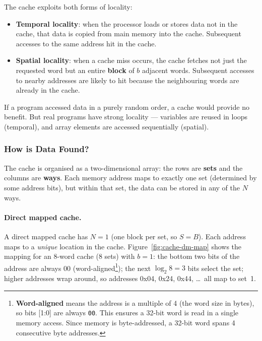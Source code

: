 \documentclass[9pt, a4paper]{extarticle}
\begin{document}
The cache exploits both forms of locality:

\begin{itemize}
    \item \textbf{Temporal locality}: when the processor loads or stores data not in the cache, that data is copied from main memory into the cache. Subsequent accesses to the same address hit in the cache.
    \item \textbf{Spatial locality}: when a cache miss occurs, the cache fetches not just the requested word but an entire \textbf{block} of $b$ adjacent words. Subsequent accesses to nearby addresses are likely to hit because the neighbouring words are already in the cache.
\end{itemize}

If a program accessed data in a purely random order, a cache would provide no benefit. But real programs have strong locality --- variables are reused in loops (temporal), and array elements are accessed sequentially (spatial).

\subsubsection{How is Data Found?}

The cache is organised as a two-dimensional array: the rows are \textbf{sets} and the columns are \textbf{ways}. Each memory address maps to exactly one set (determined by some address bits), but within that set, the data can be stored in any of the $N$ ways.


\paragraph{Direct mapped cache.} A direct mapped cache has $N = 1$ (one block per set, so $S = B$). Each address maps to a \emph{unique} location in the cache. Figure~\ref{fig:cache-dm-map} shows the mapping for an 8-word cache (8 sets) with $b = 1$: the bottom two bits of the address are always 00 (word-aligned\footnote{\textbf{Word-aligned} means the address is a multiple of 4 (the word size in bytes), so bits [1:0] are always \texttt{00}. This ensures a 32-bit word is read in a single memory access. Since memory is byte-addressed, a 32-bit word spans 4 consecutive byte addresses.}); the next $\log_2 8 = 3$ bits select the set; higher addresses wrap around, so addresses 0x04, 0x24, 0x44, \ldots\ all map to set~1.
\end{document}
